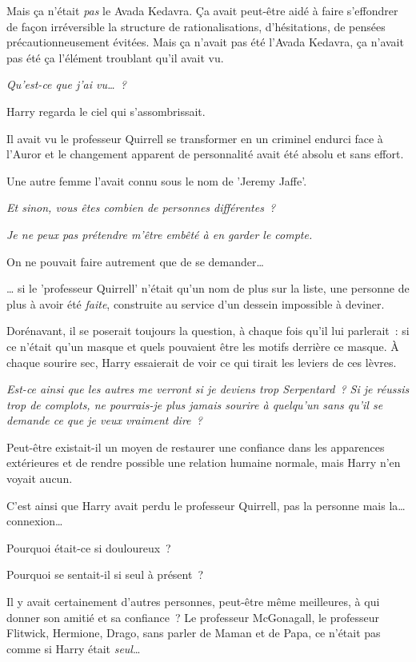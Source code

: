 Mais ça n'était \emph{pas} le Avada Kedavra. Ça avait peut-être aidé à faire s'effondrer de façon irréversible la structure de rationalisations, d'hésitations, de pensées précautionneusement évitées. Mais ça n'avait pas été l'Avada Kedavra, ça n'avait pas été ça l'élément troublant qu'il avait vu.

\emph{Qu'est-ce que j'ai vu…~?}

Harry regarda le ciel qui s'assombrissait.

Il avait vu le professeur Quirrell se transformer en un criminel endurci face à l'Auror et le changement apparent de personnalité avait été absolu et sans effort.

Une autre femme l'avait connu sous le nom de 'Jeremy Jaffe'.

\emph{Et sinon, vous êtes combien de personnes différentes~?}

\emph{Je ne peux pas prétendre m'être embêté à en garder le compte.}

On ne pouvait faire autrement que de se demander…

… si le 'professeur Quirrell' n'était qu'un nom de plus sur la liste, une personne de plus à avoir été \emph{faite}, construite au service d'un dessein impossible à deviner.

Dorénavant, il se poserait toujours la question, à chaque fois qu'il lui parlerait~: si ce n'était qu'un masque et quels pouvaient être les motifs derrière ce masque. À chaque sourire sec, Harry essaierait de voir ce qui tirait les leviers de ces lèvres.

\emph{Est-ce ainsi que les autres me verront si je deviens trop Serpentard~? Si je réussis trop de complots, ne pourrais-je plus jamais sourire à quelqu'un sans qu'il se demande ce que je veux vraiment dire~?}

Peut-être existait-il un moyen de restaurer une confiance dans les apparences extérieures et de rendre possible une relation humaine normale, mais Harry n'en voyait aucun.

C'est ainsi que Harry avait perdu le professeur Quirrell, pas la personne mais la… connexion…

Pourquoi était-ce si douloureux~?

Pourquoi se sentait-il si seul à présent~?

Il y avait certainement d'autres personnes, peut-être même meilleures, à qui donner son amitié et sa confiance~? Le professeur McGonagall, le professeur Flitwick, Hermione, Drago, sans parler de Maman et de Papa, ce n'était pas comme si Harry était \emph{seul}…

